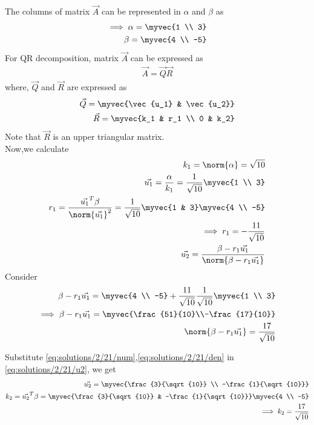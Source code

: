 
The columns of matrix $\vec{A}$ can be represented in $\alpha$ and $\beta$ as
\begin{align}
    \implies\alpha=\myvec{1 \\ 3}\\
    \beta=\myvec{4 \\ -5}
\end{align}
For QR decomposition, matrix $\vec{A}$ can be expressed as
\begin{align}
    \vec{A}=\vec{Q}\vec{R}\label{eq:solutions/2/21/decomp}
\end{align}
where, $\vec{Q}$ and $\vec{R}$ are expressed as
\begin{align}
    \vec{Q}=\myvec{\vec{u_1} & \vec{u_2}}\label{eq:solutions/2/21/Q}\\
    \vec{R}=\myvec{k_1 & r_1 \\ 0 & k_2}\label{eq:solutions/2/21/R}
\end{align}
Note that $\vec{R}$ is an upper triangular matrix.\\
Now,we calculate
\begin{align}
    k_1=\norm{\alpha}=\sqrt{10}\\
    \vec{u_1}=\frac{\alpha}{k_1}=\frac{1}{\sqrt{10}}\myvec{1 \\ 3}\\
    r_1=\frac{\vec{u_1}^T\beta}{\norm{\vec{u_1}}^2}=\frac{1}{\sqrt{10}}\myvec{1 & 3}\myvec{4 \\ -5}\\
    \implies r_1=-\frac{11}{\sqrt{10}}\\
    \vec{u_2}=\frac{\beta-r_1\vec{u_1}}{\norm{\beta-r_1\vec{u_1}}}\label{eq:solutions/2/21/u2}
\end{align}
Consider
\begin{align}
    \beta-r_1\vec{u_1}=\myvec{4 \\ -5}+\frac{11}{\sqrt{10}}\frac{1}{\sqrt{10}}\myvec{1 \\ 3}\\
    \implies\beta-r_1\vec{u_1}=\myvec{\frac{51}{10}\\-\frac{17}{10}}\label{eq:solutions/2/21/num}\\
    \norm{\beta-r_1\vec{u_1}}=\frac{17}{\sqrt{10}}\label{eq:solutions/2/21/den}
\end{align}

Substitute \eqref{eq:solutions/2/21/num},\eqref{eq:solutions/2/21/den} in \eqref{eq:solutions/2/21/u2}, we get
\begin{align}
    \vec{u_2}=\myvec{\frac{3}{\sqrt{10}} \\ -\frac{1}{\sqrt{10}}}\\
    k_2=\vec{u_2}^T\beta=\myvec{\frac{3}{\sqrt{10}} & -\frac{1}{\sqrt{10}}}\myvec{4 \\ -5}\\
    \implies k_2=\frac{17}{\sqrt{10}}
\end{align}

